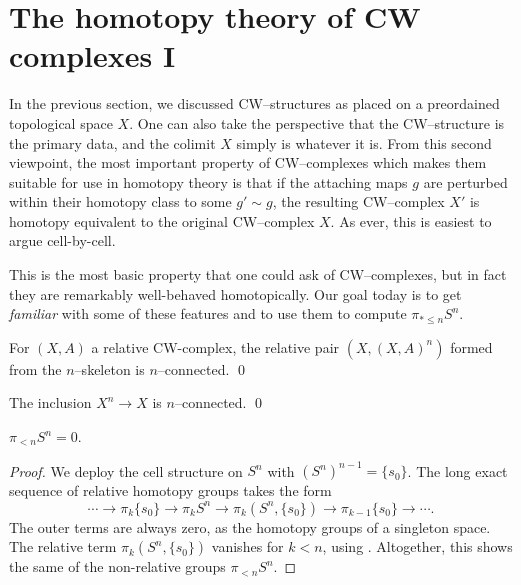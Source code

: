 \section{The homotopy theory of CW complexes I}

In the previous section, we discussed CW--structures as placed on a preordained topological space $X$.
One can also take the perspective that the CW--structure is the primary data, and the colimit $X$ simply is whatever it is.
From this second viewpoint, the most important property of CW--complexes which makes them suitable for use in homotopy theory is that if the attaching maps $g$ are perturbed within their homotopy class to some $g' \sim g$, the resulting CW--complex $X'$ is homotopy equivalent to the original CW--complex $X$.
As ever, this is easiest to argue cell-by-cell.



This is the most basic property that one could ask of CW--complexes, but in fact they are remarkably well-behaved homotopically.  Our goal today is to get \emph{familiar} with some of these features and to use them to compute $\pi_{* \le n} S^n$.

\begin{lemma}%
For $(X, A)$ a relative CW-complex, the relative pair $(X, (X, A)^n)$ formed from the $n$--skeleton is $n$--connected. \qed
\end{lemma}

\begin{corollary}\label{XnIntoXIsNConnected}%
The inclusion $X^n \to X$ is $n$--connected. \qed
\end{corollary}

\begin{corollary}
$\pi_{< n} S^n = 0$.
\end{corollary}
\begin{proof}
We deploy the cell structure on $S^n$ with $(S^n)^{n-1} = \{s_0\}$.
The long exact sequence of relative homotopy groups takes the form \[\cdots \to \pi_k \{s_0\} \to \pi_k S^n \to \pi_k (S^n, \{s_0\}) \to \pi_{k-1} \{s_0\} \to \cdots.\]
The outer terms are always zero, as the homotopy groups of a singleton space.
The relative term $\pi_k (S^n, \{s_0\})$ vanishes for $k < n$, using .
Altogether, this shows the same of the non-relative groups $\pi_{<n} S^n$.
\end{proof}

